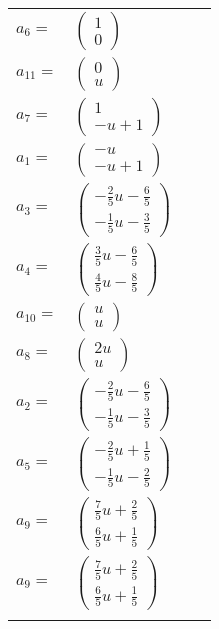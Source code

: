 \documentclass[1p]{elsarticle_modified}
\theoremstyle{definition}
\begin{document}
\begin{tabular}{m{7pt} m{180pt} m{7pt} m{180pt} }
\flushright $a_{6}=$&$\begin{pmatrix}1\\0\end{pmatrix}$ \\
\flushright $a_{11}=$&$\begin{pmatrix}0\\u\end{pmatrix}$ \\
\flushright $a_{7}=$&$\begin{pmatrix}1\\- u+1\end{pmatrix}$ \\
\flushright $a_{1}=$&$\begin{pmatrix}- u\\- u+1\end{pmatrix}$ \\
\flushright $a_{3}=$&$\begin{pmatrix}-\frac{2}{5} u-\frac{6}{5}\\-\frac{1}{5} u-\frac{3}{5}\end{pmatrix}$ \\
\flushright $a_{4}=$&$\begin{pmatrix}\frac{3}{5} u-\frac{6}{5}\\\frac{4}{5} u-\frac{8}{5}\end{pmatrix}$ \\
\flushright $a_{10}=$&$\begin{pmatrix}u\\u\end{pmatrix}$ \\
\flushright $a_{8}=$&$\begin{pmatrix}2 u\\u\end{pmatrix}$ \\
\flushright $a_{2}=$&$\begin{pmatrix}-\frac{2}{5} u-\frac{6}{5}\\-\frac{1}{5} u-\frac{3}{5}\end{pmatrix}$ \\
\flushright $a_{5}=$&$\begin{pmatrix}-\frac{2}{5} u+\frac{1}{5}\\-\frac{1}{5} u-\frac{2}{5}\end{pmatrix}$ \\
\flushright $a_{9}=$&$\begin{pmatrix}\frac{7}{5} u+\frac{2}{5}\\\frac{6}{5} u+\frac{1}{5}\end{pmatrix}$\\ \flushright $a_{9}=$&$\begin{pmatrix}\frac{7}{5} u+\frac{2}{5}\\\frac{6}{5} u+\frac{1}{5}\end{pmatrix}$\\&\end{tabular}
\end{document}
